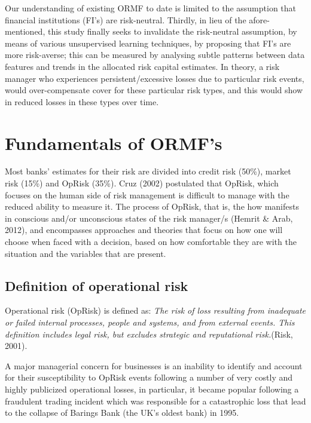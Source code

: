 \documentclass{DissertateUSU}
\begin{document}
Our understanding of existing ORMF to date is limited to the assumption
that financial institutions (FI's) are risk-neutral. Thirdly, in lieu of
the afore-mentioned, this study finally seeks to invalidate the
risk-neutral assumption, by means of various unsupervised learning
techniques, by proposing that FI's are more risk-averse; this can be
measured by analysing subtle patterns between data features and trends
in the allocated risk capital estimates. In theory, a risk manager who
experiences persistent/excessive losses due to particular risk events,
would over-compensate cover for these particular risk types, and this
would show in reduced losses in these types over time.

\section{Fundamentals of ORMF's}
\label{sec:Fundamentals of ORMF's}

Most banks' estimates for their risk are divided into credit risk
(50\%), market risk (15\%) and OpRisk (35\%). Cruz (2002) postulated
that OpRisk, which focuses on the human side of risk management is
difficult to manage with the reduced ability to measure it. The process
of OpRisk, that is, the how manifests in conscious and/or unconscious
states of the risk manager/s (Hemrit \& Arab, 2012), and encompasses
approaches and theories that focus on how one will choose when faced
with a decision, based on how comfortable they are with the situation
and the variables that are present.

\subsection{Definition of operational risk}
\label{ssec:Definition of operational risk}

Operational risk (OpRisk) is defined as:
\emph{The risk of loss resulting from inadequate or failed internal processes, people and systems, and from external events. This definition includes legal risk, but excludes strategic and reputational risk.}(Risk,
2001).\medskip

A major managerial concern for businesses is an inability to identify
and account for their susceptibility to OpRisk events following a number
of very costly and highly publicized operational losses, in particular,
it became popular following a fraudulent trading incident which was
responsible for a catastrophic loss that lead to the collapse of Barings
Bank (the UK's oldest bank) in 1995.\medskip
\end{document}
